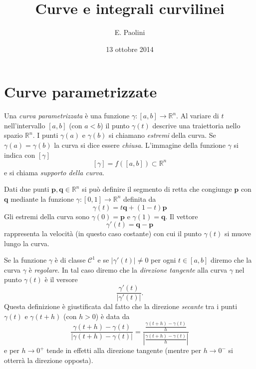 \documentclass[italian,a4paper,hidelinks]{scrartcl}
\title{Curve e integrali curvilinei}
\author{E. Paolini}
\date{13 ottobre 2014}
\newcommand{\RR}{{\mathbb R}}
\newcommand{\C}{{\mathcal C}}
\newcommand{\defeq}{=}
\begin{document}
\maketitle

\section{Curve parametrizzate}

Una \emph{curva parametrizzata}
è una funzione $\gamma\colon [a,b]\to
\RR^n$. Al variare di $t$ nell'intervallo $[a,b]$ (con $a<b$) il punto
$\gamma(t)$ descrive una traiettoria nello spazio $\RR^n$. I punti
$\gamma(a)$ e $\gamma(b)$ si chiamano \emph{estremi} della
curva. Se $\gamma(a)=\gamma(b)$ la curva si dice essere \emph{chiusa}.
L'immagine della funzione $\gamma$ si indica con $[\gamma]$
\[
  [\gamma] \defeq f([a,b]) \subset \RR^n
\]
e si chiama \emph{supporto della curva}.

\begin{example}[il segmento]
Dati due punti $\mathbf p, \mathbf q\in \RR^n$ si può definire il
segmento di retta che congiunge $\mathbf p$ con $\mathbf q$ mediante la funzione
$\gamma\colon [0,1] \to \RR^n$ definita da
\[
  \gamma(t) = t \mathbf q + (1-t)\mathbf p
\]
Gli estremi della curva sono $\gamma(0) = \mathbf p$ e $\gamma(1)=
\mathbf q$. Il vettore
\[
  \gamma'(t) = \mathbf q- \mathbf p
\]
rappresenta la velocità (in questo caso costante) con cui il punto
$\gamma(t)$ si muove lungo la curva.
\end{example}

Se la funzione $\gamma$ è di classe $\C^1$ e se $\lvert
\gamma'(t)\rvert \neq 0$ per ogni $t \in [a,b]$ diremo che la curva $\gamma$ è
\emph{regolare}. In tal caso diremo che la \emph{direzione tangente}
alla
curva $\gamma$ nel punto $\gamma(t)$ è il versore
\[
    \frac{\gamma'(t)}{\lvert \gamma'(t)\rvert}.
\]
Questa definizione è giustificata dal fatto che la direzione
\emph{secante} tra i punti $\gamma(t)$ e $\gamma(t+h)$ (con $h>0$)
è data da
\[
     \frac{\gamma(t+h)-\gamma(t)}{\lvert \gamma(t+h) -
       \gamma(t)\rvert}
     =
     \frac{\frac{\gamma(t+h)-\gamma(t)}{h}}{\left|\frac{\gamma(t+h)-\gamma(t)}{h}\right|}
\]
e per $h\to 0^+$ tende in effetti alla direzione tangente (mentre per $h\to 0^-$ si otterrà la direzione opposta).
\end{document}
